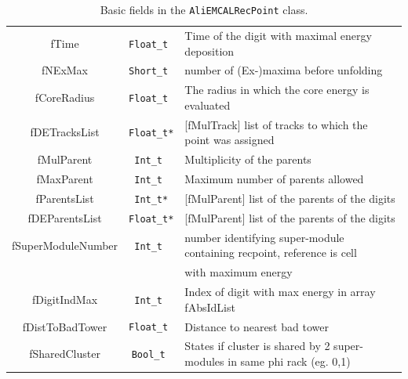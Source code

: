 \begin{table}[!h]
\begin{center}
\begin{tabular}{| c | c | l |}
	fTime             &  \texttt{Float\_t  }  &  Time of the digit with maximal energy deposition\\
	fNExMax           &  \texttt{Short\_t  }  &  number of (Ex-)maxima before unfolding\\
	fCoreRadius       &  \texttt{Float\_t  }  &  The radius in which the core energy is evaluated\\
	fDETracksList     &  \texttt{Float\_t*}   & [fMulTrack] list of tracks to which the point was assigned\\
	fMulParent        &  \texttt{Int\_t    }  &  Multiplicity of the parents\\
	fMaxParent        &  \texttt{Int\_t    }  &  Maximum number of parents allowed\\
	fParentsList      &  \texttt{Int\_t*}     &  [fMulParent] list of the parents of the digits\\
	fDEParentsList    &  \texttt{Float\_t*}   &  [fMulParent] list of the parents of the digits\\
	fSuperModuleNumber&  \texttt{Int\_t    }  &  number identifying super-module containing recpoint, reference is cell \\
& & with maximum energy\\
	fDigitIndMax      &  \texttt{Int\_t    }  &  Index of digit with max energy in array fAbsIdList\\
	fDistToBadTower   &  \texttt{Float\_t  }  &  Distance to nearest bad tower\\
	fSharedCluster    &  \texttt{Bool\_t   }  &  States if cluster is shared by 2 super-modules in same phi rack (eg. 0,1)\\
	\hline
  \end{tabular}
\end{center}
\caption{Basic fields in the \texttt{AliEMCALRecPoint} class.}
\label{tab:recpoint}
\end{table}
%
\clearpage
